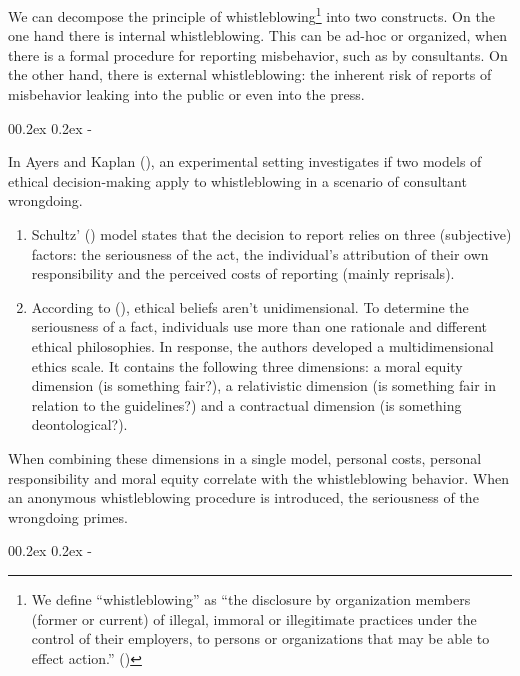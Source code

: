 \documentclass[
  man,floatsintext]{apa6}
\makeatletter
\providecommand{\tightlist}{%
  \setlength{\itemsep}{0pt}\setlength{\parskip}{0pt}}
\let\oldsubparagraph\subparagraph
\renewcommand{\subparagraph}[1]{\oldsubparagraph{#1}\mbox{}}
\renewcommand{\subparagraph}[1]{\@startsection{subparagraph}{5}{1em}%
  {0\baselineskip \@plus 0.2ex \@minus 0.2ex}%
  {-\z@\relax}%
  {\normalfont\normalsize\itshape\hspace{\parindent}{#1}\textit{\addperi}}{\relax}}
\makeatother
\begin{document}
We can decompose the principle of whistleblowing\footnote{We define ``whistleblowing'' as ``the disclosure by organization members (former or current) of illegal, immoral or illegitimate practices under the control of their employers, to persons or organizations that may be able to effect action.'' ()} into two constructs. On the one hand there is internal whistleblowing. This can be ad-hoc or organized, when there is a formal procedure for reporting misbehavior, such as by consultants. On the other hand, there is external whistleblowing: the inherent risk of reports of misbehavior leaking into the public or even into the press.

\subparagraph{Internal whistleblowing}\label{internal-whistleblowing}

In Ayers and Kaplan (), an experimental setting investigates if two models of ethical decision-making apply to whistleblowing in a scenario of consultant wrongdoing.

\begin{enumerate}
\def\labelenumi{\arabic{enumi}.}
\tightlist
\item
  Schultz' () model states that the decision to report relies on three (subjective) factors: the seriousness of the act, the individual's attribution of their own responsibility and the perceived costs of reporting (mainly reprisals).
\item
  According to (), ethical beliefs aren't unidimensional. To determine the seriousness of a fact, individuals use more than one rationale and different ethical philosophies. In response, the authors developed a multidimensional ethics scale. It contains the following three dimensions: a moral equity dimension (is something fair?), a relativistic dimension (is something fair in relation to the guidelines?) and a contractual dimension (is something deontological?).
\end{enumerate}

When combining these dimensions in a single model, personal costs, personal responsibility and moral equity correlate with the whistleblowing behavior. When an anonymous whistleblowing procedure is introduced, the seriousness of the wrongdoing primes.

\subparagraph{External whistleblowing}\label{external-whistleblowing}
\end{document}
